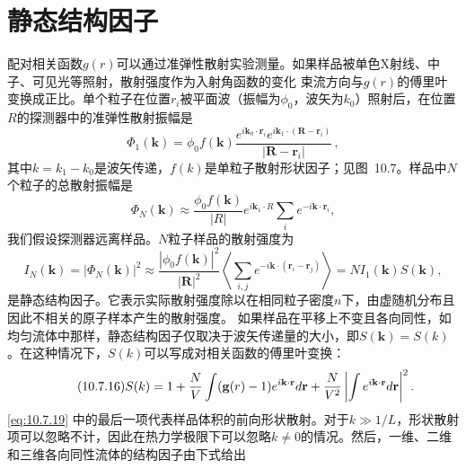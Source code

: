 \section{静态结构因子}\label{ux9759ux6001ux7ed3ux6784ux56e0ux5b50}
配对相关函数\(g(r)\)可以通过准弹性散射实验测量。如果样品被单色X射线、中子、可见光等照射，散射强度作为入射角函数的变化
束流方向与\(g(r)\)的傅里叶变换成正比。单个粒子在位置\(r_i\)被平面波（振幅为\(\phi_0\)，波矢为\(k_0\)）照射后，在位置\(R\)的探测器中的准弹性散射振幅是
\begin{equation}\tag{10.7.13}\label{eq:10.7.13}
\Phi _ { 1 } ( \pmb { k } ) = \phi _ { 0 } f ( \pmb { k } ) \frac { e ^{i \pmb { k} _ { 0 } \cdot \pmb { r } _ { i } } e ^{i \pmb { k} _ { 1 } \cdot ( \pmb { R } - \pmb { r } _ { i } ) } } { | \pmb { R } - \pmb { r } _ { i } | } \, ,
\end{equation}
其中\(k=k_{1}-k_{0}\)是波矢传递，\(f(k)\)是单粒子散射形状因子；见图~10.7。样品中\(N\)个粒子的总散射振幅是
\begin{equation}\tag{10.7.14}\label{eq:10.7.14}
\Phi _ { N } ( \pmb { k } ) \approx \frac { \phi _ { 0 } f ( \pmb { k } ) } { | R | } e ^{i \pmb { k} _ { 1 } \cdot R } \sum _ { i } e ^{- i \pmb { k} \cdot \pmb { r } _ { i } } ,
\end{equation}
我们假设探测器远离样品。\(N\)粒子样品的散射强度为
\begin{equation}\tag{10.7.15}\label{eq:10.7.15}
I _ { N } ( \pmb { k } ) = \left| \Phi _ { N } ( \pmb { k } ) \right| ^{2} \approx \frac { \left| \phi _ { 0 } f ( \pmb { k } ) \right| ^{2} } { | \pmb { R } | ^{2} } \left\langle \sum _ { i , j } e ^{- i \pmb { k} \cdot ( \pmb { r } _ { i } - \pmb { r } _ { j } ) } \right\rangle = N I _ { 1 } ( \pmb { k } ) S ( \pmb { k } ) ,
\end{equation}
是静态结构因子。它表示实际散射强度除以在相同粒子密度\(n\)下，由虚随机分布且因此不相关的原子样本产生的散射强度。
如果样品在平移上不变且各向同性，如均匀流体中那样，静态结构因子仅取决于波矢传递量的大小，即\(S(\boldsymbol{k})=S(k)\)。在这种情况下，\(S(k)\)可以写成对相关函数的傅里叶变换：
\begin{equation}\tag{10.7.16}\label{eq:10.7.16}
S ( k ) = 1 + \frac { N } { V } \int ( { \bf g } ( r ) - 1 ) e ^{i { \bf k} \cdot { \bf r } } d { \bf r } + \frac { N } { V ^{2} } \left| \int e ^{i { \bf k} \cdot { \bf r } } d { \bf r } \right| ^{2} .
\end{equation}
\autoref{eq:10.7.19} 中的最后一项代表样品体积的前向形状散射。对于\(k \gg 1/L\)，形状散射项可以忽略不计，因此在热力学极限下可以忽略\(k \neq 0\)的情况。然后，一维、二维和三维各向同性流体的结构因子由下式给出
